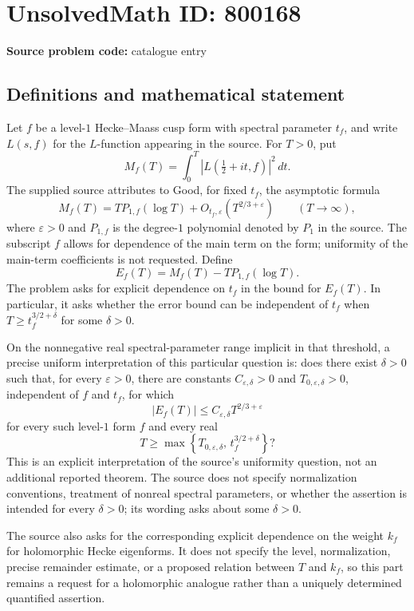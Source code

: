 \documentclass[11pt]{article}
\begin{document}
\section*{UnsolvedMath ID: 800168}
\textbf{Source problem code:} catalogue entry
\subsection{Definitions and mathematical statement}
Let \(f\) be a level-\(1\) Hecke--Maass cusp form with spectral parameter \(t_f\), and write \(L(s,f)\) for the \(L\)-function appearing in the source. For \(T>0\), put
\[
M_f(T)=\int_0^T\left|L\!\left(\tfrac12+it,f\right)\right|^2\,dt.
\]
The supplied source attributes to Good, for fixed \(t_f\), the asymptotic formula
\[
M_f(T)=T P_{1,f}(\log T)+O_{t_f,\varepsilon}\!\left(T^{2/3+\varepsilon}\right)
\qquad(T\to\infty),
\]
where \(\varepsilon>0\) and \(P_{1,f}\) is the degree-\(1\) polynomial denoted by \(P_1\) in the source. The subscript \(f\) allows for dependence of the main term on the form; uniformity of the main-term coefficients is not requested. Define
\[
E_f(T)=M_f(T)-T P_{1,f}(\log T).
\]
The problem asks for explicit dependence on \(t_f\) in the bound for \(E_f(T)\). In particular, it asks whether the error bound can be independent of \(t_f\) when \(T\geq t_f^{3/2+\delta}\) for some \(\delta>0\).

On the nonnegative real spectral-parameter range implicit in that threshold, a precise uniform interpretation of this particular question is: does there exist \(\delta>0\) such that, for every \(\varepsilon>0\), there are constants \(C_{\varepsilon,\delta}>0\) and \(T_{0,\varepsilon,\delta}>0\), independent of \(f\) and \(t_f\), for which
\[
|E_f(T)|\leq C_{\varepsilon,\delta}T^{2/3+\varepsilon}
\]
for every such level-\(1\) form \(f\) and every real
\[
T\geq\max\!\left\{T_{0,\varepsilon,\delta},\,t_f^{3/2+\delta}\right\}?
\]
This is an explicit interpretation of the source's uniformity question, not an additional reported theorem. The source does not specify normalization conventions, treatment of nonreal spectral parameters, or whether the assertion is intended for every \(\delta>0\); its wording asks about some \(\delta>0\).

The source also asks for the corresponding explicit dependence on the weight \(k_f\) for holomorphic Hecke eigenforms. It does not specify the level, normalization, precise remainder estimate, or a proposed relation between \(T\) and \(k_f\), so this part remains a request for a holomorphic analogue rather than a uniquely determined quantified assertion.
\end{document}
